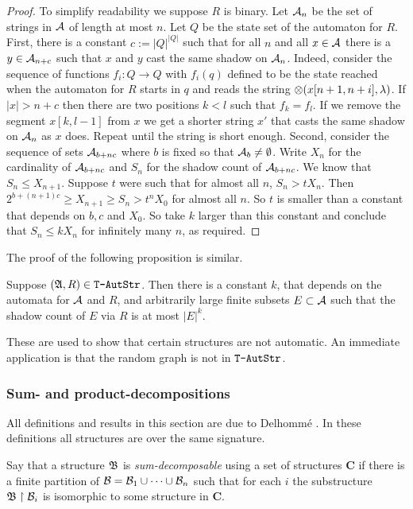 \begin{proof} To simplify readability we suppose $R$ is binary.
Let ${\mathcal A}_n$ be the set of strings in ${{\mathcal A}}$ of length at most $n$. Let $Q$ be the state set of the automaton for $R$. 
First,  there is a constant $c := |Q|^{|Q|}$ such that for all $n$ and all $x \in {{\mathcal A}}$ there is a 
$y \in {\mathcal A}_{n+c}$ such that $x$ and $y$ cast the same shadow on ${\mathcal A}_n$. Indeed, consider the sequence of functions $f_i:Q \to Q$
with $f_i(q)$ defined to be the state reached when the automaton for $R$ starts in $q$ and reads the
string $\otimes(x[n+1,n+i],\lambda)$.  If $|x| > n + c$ then there are two positions  $k < l$ such that $f_k = f_l$. If we remove the segment $x[k,l-1]$ from $x$ we
get a shorter string $x'$ that casts the same shadow on ${\mathcal A}_n$ as $x$ does. Repeat until the string is short enough.
Second, consider the sequence of sets
${\mathcal A}_{b+nc}$ where $b$ is fixed so that ${\mathcal A}_b \neq \emptyset$. Write $X_n$ for the cardinality of ${\mathcal A}_{b+nc}$ and $S_n$ for the shadow count of ${\mathcal A}_{b+nc}$. 
We know that $S_n \leq X_{n+1}$. Suppose $t$ were such that for almost all $n$, $S_n > t X_n$.  Then $2^{b+(n+1)c} \geq X_{n+1} \geq S_n > t^n X_0$ for almost all $n$. So  $t$ is smaller than a constant that depends on $b,c$ and $X_0$. So take $k$ larger than this constant and conclude that $S_n \leq k X_n$ for infinitely many $n$, as required.
\end{proof}

The proof of the following proposition is similar.
\begin{proposition}
Suppose $(\mathfrak{A},R) \in \mbox{\tt T-AutStr}$.
Then there is a constant $k$, 
that depends on the automata for ${\mathcal A}$ and $R$, and arbitrarily large finite subsets $E \subset {{\mathcal A}}$ such
that the shadow count of $E$ via $R$  is at most $|E|^k$.
\end{proposition}

These are used to show that certain structures are not automatic. An immediate application is that the random graph is not in $\mbox{\tt T-AutStr}$.

\subsubsection*{Sum- and product-decompositions}

All definitions and results in this section are due to Delhomm\'e \cite{Delh04}.
In these definitions all structures are over the same signature.

\begin{definition} 
Say that a structure $\mathfrak{B}$ is {\em sum-decomposable} using a set of structures
$\mathbf{C}$ if there is a finite partition of ${\mathcal B}
= {\mathcal B}_1 \cup \cdots \cup {\mathcal B}_n$ such that for each $i$ the substructure $\mathfrak{B}
\restriction {\mathcal B}_i$ is isomorphic to some structure in $\mathbf{C}$.
\end{definition}


